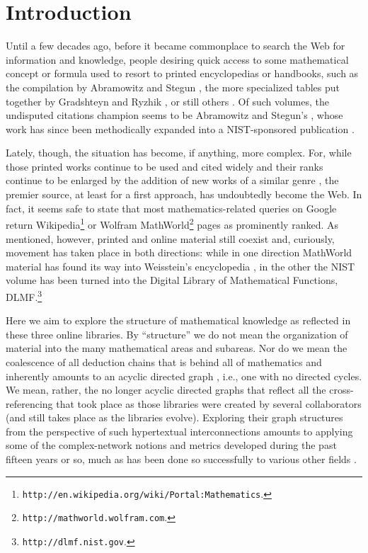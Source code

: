 \documentclass{article}
\begin{document}
\newpage
\section{Introduction}\label{intr}

Until a few decades ago, before it became commonplace to search the Web for
information and knowledge, people desiring quick access to some mathematical
concept or formula used to resort to printed encyclopedias or handbooks, such as
the compilation by Abramowitz and Stegun \cite{as65}, the more specialized
tables put together by Gradshteyn and Ryzhik \cite{gr00}, or still others
\cite{i93,bsmm04}. Of such volumes, the undisputed citations champion seems to
be Abramowitz and Stegun's \cite{bclo11}, whose work has since been methodically
expanded \cite{l03} into a NIST-sponsored publication \cite{olbc10}.

Lately, though, the situation has become, if anything, more complex. For, while
those printed works continue to be used and cited widely and their ranks
continue to be enlarged by the addition of new works of a similar genre
\cite{gbl08}, the premier source, at least for a first approach, has undoubtedly
become the Web. In fact, it seems safe to state that most mathematics-related
queries on Google return
Wikipedia\footnote{\texttt{http://en.wikipedia.org/wiki/Portal:Mathematics}.}
or Wolfram MathWorld\footnote{\texttt{http://mathworld.wolfram.com}.} pages as
prominently ranked. As mentioned, however, printed and online material still
coexist and, curiously, movement has taken place in both directions: while in
one direction MathWorld material has found its way into Weisstein's
encyclopedia \cite{w02}, in the other the NIST volume has been turned into the
Digital Library of Mathematical Functions,
DLMF.\footnote{\texttt{http://dlmf.nist.gov}.}

Here we aim to explore the structure of mathematical knowledge as reflected in
these three online libraries. By ``structure'' we do not mean the organization
of material into the many mathematical areas and subareas. Nor do we mean the
coalescence of all deduction chains that is behind all of mathematics and
inherently amounts to an acyclic directed graph \cite{c02}, i.e., one with no
directed cycles. We mean, rather, the no longer acyclic directed graphs that
reflect all the cross-referencing that took place as those libraries were
created by several collaborators (and still takes place as the libraries
evolve). Exploring their graph structures from the perspective of such
hypertextual interconnections amounts to applying some of the complex-network
notions and metrics developed during the past fifteen years or so, much as has
been done so successfully to various other fields \cite{bs03,nbw06,bkm09}.
\end{document}
